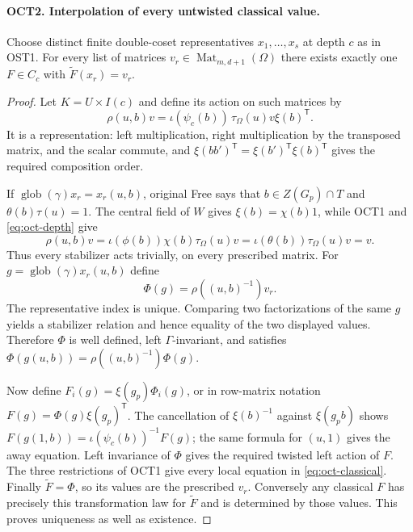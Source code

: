 \paragraph{OCT2. Interpolation of every untwisted classical value.}
\label{claim:OCT2}
Choose distinct finite double-coset representatives $x_1,\ldots,x_s$
at depth $c$ as in OST1.  For every list of matrices
$v_r\in\operatorname{Mat}_{m,d+1}(\Omega)$ there exists exactly
one $F\in C_c$ with $\widetilde F(x_r)=v_r$.
\begin{proof}
Let $K=U\times I(c)$ and define its action on such matrices by
\[
 \rho(u,b)v=\iota(\psi_c(b))\,
                   \tau_\Omega(u)v\xi(b)^{\mathsf T}.
\]
It is a representation: left multiplication, right multiplication
by the transposed matrix, and the scalar commute, and
$\xi(bb')^{\mathsf T}=\xi(b')^{\mathsf T}\xi(b)^{\mathsf T}$
gives the required composition order.

If $\operatorname{glob}(\gamma)x_r=x_r(u,b)$, original Free
says that $b\in Z(G_p)\cap T$ and
$\theta(b)\tau(u)=1$.  The central field of $W$ gives
$\xi(b)=\chi(b)1$, while OCT1 and \eqref{eq:oct-depth} give
\[
 \rho(u,b)v=\iota(\phi(b))\chi(b)\tau_\Omega(u)v
                       =\iota(\theta(b))\tau_\Omega(u)v=v.
\]
Thus every stabilizer acts trivially, on every prescribed matrix.
For $g=\operatorname{glob}(\gamma)x_r(u,b)$ define
\[
                 \Phi(g)=\rho((u,b)^{-1})v_r.
\]
The representative index is unique.  Comparing two factorizations
of the same $g$ yields a stabilizer relation and hence equality of
the two displayed values.  Therefore $\Phi$ is well defined, left
$\Gamma$-invariant, and satisfies
$\Phi(g(u,b))=\rho((u,b)^{-1})\Phi(g)$.

Now define $F_i(g)=\xi(g_p)\Phi_i(g)$, or in row-matrix notation
$F(g)=\Phi(g)\xi(g_p)^{\mathsf T}$.  The cancellation of
$\xi(b)^{-1}$ against $\xi(g_pb)$ shows
$F(g(1,b))=\iota(\psi_c(b))^{-1}F(g)$; the same formula for
$(u,1)$ gives the away equation.  Left invariance of $\Phi$ gives
the required twisted left action of $F$.  The three restrictions
of OCT1 give every local equation in \eqref{eq:oct-classical}.
Finally $\widetilde F=\Phi$, so its values are the prescribed
$v_r$.  Conversely any classical $F$ has precisely this
transformation law for $\widetilde F$ and is determined by those
values.  This proves uniqueness as well as existence.
\end{proof}

